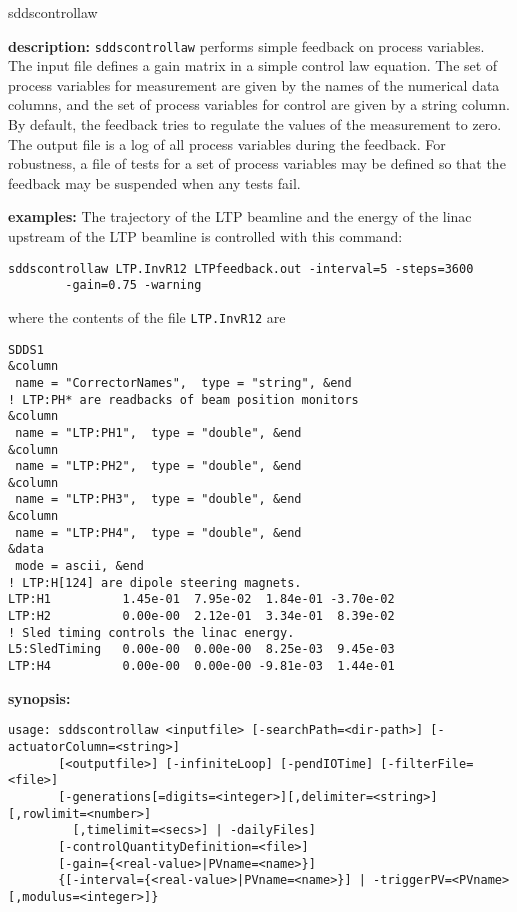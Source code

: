 \begin{sddsprog}{sddscontrollaw}
\item \textbf{description:}
\verb+sddscontrollaw+ performs simple feedback on process variables.
The input file defines a gain matrix in a simple control law equation. The set of process variables for
measurement are given by the names of the numerical data columns, and the set
of process variables for control are given by a string column. By default,
the feedback tries to regulate the values of the measurement to zero.
The output file is a log of all process variables during the feedback.
For robustness, a file of tests for a set of process variables may be defined
so that the feedback may be suspended when any tests fail.

\item \textbf{examples:}
The trajectory of the LTP beamline and the energy of the linac upstream of the LTP
beamline is controlled with this command:
\begin{verbatim}
sddscontrollaw LTP.InvR12 LTPfeedback.out -interval=5 -steps=3600 
        -gain=0.75 -warning
\end{verbatim}
where the contents of the file \verb+LTP.InvR12+ are
\begin{verbatim}
SDDS1
&column
 name = "CorrectorNames",  type = "string", &end
! LTP:PH* are readbacks of beam position monitors
&column
 name = "LTP:PH1",  type = "double", &end
&column
 name = "LTP:PH2",  type = "double", &end
&column
 name = "LTP:PH3",  type = "double", &end
&column
 name = "LTP:PH4",  type = "double", &end
&data
 mode = ascii, &end
! LTP:H[124] are dipole steering magnets.
LTP:H1          1.45e-01  7.95e-02  1.84e-01 -3.70e-02
LTP:H2          0.00e-00  2.12e-01  3.34e-01  8.39e-02
! Sled timing controls the linac energy.
L5:SledTiming   0.00e-00  0.00e-00  8.25e-03  9.45e-03
LTP:H4          0.00e-00  0.00e-00 -9.81e-03  1.44e-01
\end{verbatim}
\item \textbf{synopsis:}
\begin{verbatim}
usage: sddscontrollaw <inputfile> [-searchPath=<dir-path>] [-actuatorColumn=<string>]
       [<outputfile>] [-infiniteLoop] [-pendIOTime] [-filterFile=<file>]
       [-generations[=digits=<integer>][,delimiter=<string>][,rowlimit=<number>]
         [,timelimit=<secs>] | -dailyFiles] 
       [-controlQuantityDefinition=<file>]
       [-gain={<real-value>|PVname=<name>}]
       {[-interval={<real-value>|PVname=<name>}] | -triggerPV=<PVname>[,modulus=<integer>]} 

\end{verbatim}
\end{sddsprog}
